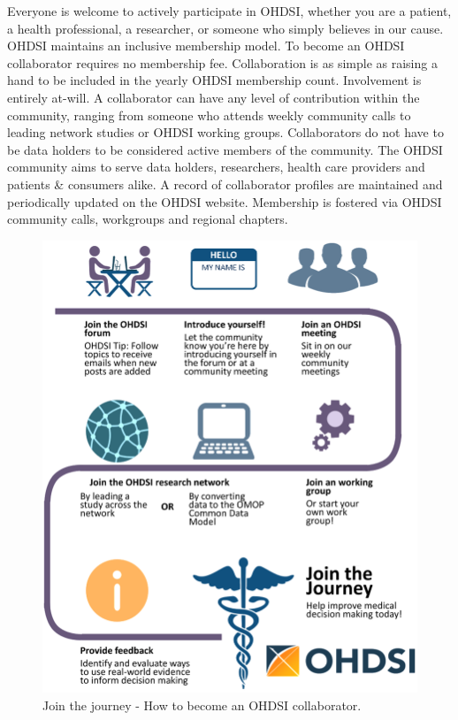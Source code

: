 \documentclass[11pt]{book}
\theoremstyle{definition}
\theoremstyle{definition}
\theoremstyle{definition}
\theoremstyle{remark}
\begin{document}
Everyone is welcome to actively participate in OHDSI, whether you are a
patient, a health professional, a researcher, or someone who simply
believes in our cause. OHDSI maintains an inclusive membership model. To
become an OHDSI collaborator requires no membership fee. Collaboration
is as simple as raising a hand to be included in the yearly OHDSI
membership count. Involvement is entirely at-will. A collaborator can
have any level of contribution within the community, ranging from
someone who attends weekly community calls to leading network studies or
OHDSI working groups. Collaborators do not have to be data holders to be
considered active members of the community. The OHDSI community aims to
serve data holders, researchers, health care providers and patients \&
consumers alike. A record of collaborator profiles are maintained and
periodically updated on the OHDSI website. Membership is fostered via
OHDSI community calls, workgroups and regional
chapters.  

\begin{figure}

{\centering \includegraphics[width=0.9\linewidth]{images/WhereToBegin/joinTheJourney} 

}

\caption{Join the journey - How to become an OHDSI collaborator.}\label{fig:jointhejourney}
\end{figure}
\end{document}

